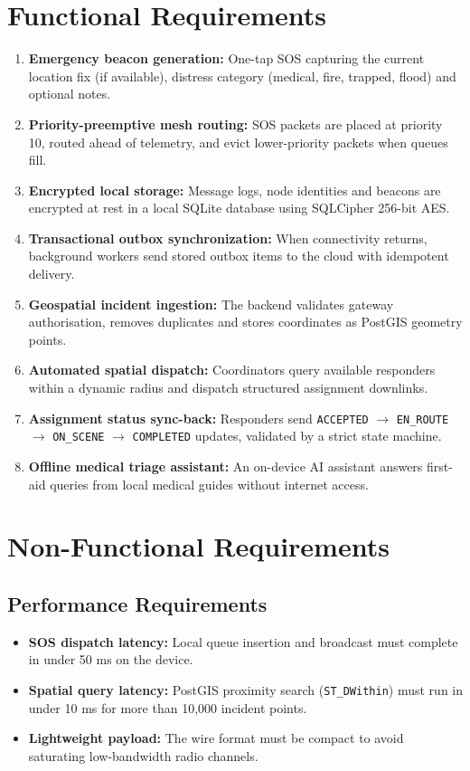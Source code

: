 \documentclass[12pt,a4paper]{report}
\begin{document}
\section{Functional Requirements}
\begin{enumerate}
    \item \textbf{Emergency beacon generation:} One-tap SOS capturing the current location fix (if available), distress category (medical, fire, trapped, flood) and optional notes.
    \item \textbf{Priority-preemptive mesh routing:} SOS packets are placed at priority 10, routed ahead of telemetry, and evict lower-priority packets when queues fill.
    \item \textbf{Encrypted local storage:} Message logs, node identities and beacons are encrypted at rest in a local SQLite database using SQLCipher 256-bit AES.
    \item \textbf{Transactional outbox synchronization:} When connectivity returns, background workers send stored outbox items to the cloud with idempotent delivery.
    \item \textbf{Geospatial incident ingestion:} The backend validates gateway authorisation, removes duplicates and stores coordinates as PostGIS geometry points.
    \item \textbf{Automated spatial dispatch:} Coordinators query available responders within a dynamic radius and dispatch structured assignment downlinks.
    \item \textbf{Assignment status sync-back:} Responders send \texttt{ACCEPTED} $\rightarrow$ \texttt{EN\_ROUTE} $\rightarrow$ \texttt{ON\_SCENE} $\rightarrow$ \texttt{COMPLETED} updates, validated by a strict state machine.
    \item \textbf{Offline medical triage assistant:} An on-device AI assistant answers first-aid queries from local medical guides without internet access.
\end{enumerate}

\section{Non-Functional Requirements}

\subsection{Performance Requirements}
\begin{itemize}
    \item \textbf{SOS dispatch latency:} Local queue insertion and broadcast must complete in under 50 ms on the device.
    \item \textbf{Spatial query latency:} PostGIS proximity search (\texttt{ST\_DWithin}) must run in under 10 ms for more than 10,000 incident points.
    \item \textbf{Lightweight payload:} The wire format must be compact to avoid saturating low-bandwidth radio channels.
\end{itemize}
\end{document}
